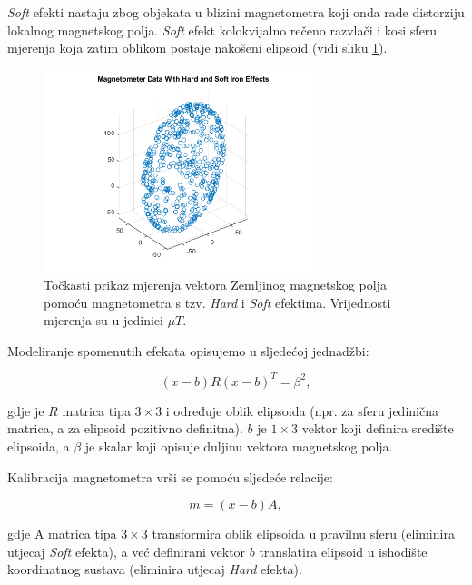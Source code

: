 \documentclass[times, utf8, diplomski, numeric]{templates/template}
\begin{document}
{{{{                \emph{Soft} efekti nastaju zbog objekata u blizini magnetometra koji onda rade distorziju lokalnog magnetskog polja. \emph{Soft} efekt kolokvijalno rečeno razvlači i kosi sferu mjerenja koja zatim oblikom postaje nakošeni elipsoid (vidi sliku \ref{fig:mag_hard_soft}).

                \begin{figure}[htb]
                \centering
                \includegraphics[width=0.7\textwidth]{images/mag_hard_soft.png}
                \caption{Točkasti prikaz mjerenja vektora Zemljinog magnetskog polja pomoću magnetometra s tzv. \emph{Hard} i \emph{Soft} efektima. Vrijednosti mjerenja su u jedinici $\mu T$.}
                \label{fig:mag_hard_soft}
                \end{figure}

                Modeliranje spomenutih efekata opisujemo u sljedećoj jednadžbi:

                \begin{equation}
                    (x - b)R(x - b)^T = \beta^2,
                \end{equation}

                gdje je $R$ matrica tipa $3\times3$ i određuje oblik elipsoida (npr. za sferu jedinična matrica, a za elipsoid pozitivno definitna). $b$ je $1\times3$ vektor koji definira središte elipsoida, a $\beta$ je skalar koji opisuje duljinu vektora magnetskog polja. 

                Kalibracija magnetometra vrši se pomoću sljedeće relacije:

                \begin{equation}
                    m = (x - b)A,
                \end{equation}

                gdje A matrica tipa $3\times3$ transformira oblik elipsoida u pravilnu sferu (eliminira utjecaj \emph{Soft} efekta), a već definirani vektor $b$ translatira elipsoid u ishodište koordinatnog sustava (eliminira utjecaj \emph{Hard} efekta).

}}}}
\end{document}
